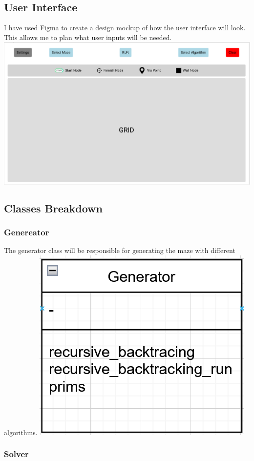 \documentclass[titlepage]{article}
\begin{document}
\subsection{User Interface}
I have used Figma to create a design mockup of how the user interface will look. This allows me to plan what user inputs will be needed.
\newline
\includegraphics[width=\linewidth]{assets/gui.PNG}
\subsection{Classes Breakdown}

\subsubsection{Genereator}

The generator class will be responsible for generating the maze with different algorithms.
\newline
\includegraphics[width=0.5\linewidth]{assets/class diagrams/generator.PNG}

\subsubsection{Solver}
\end{document}
